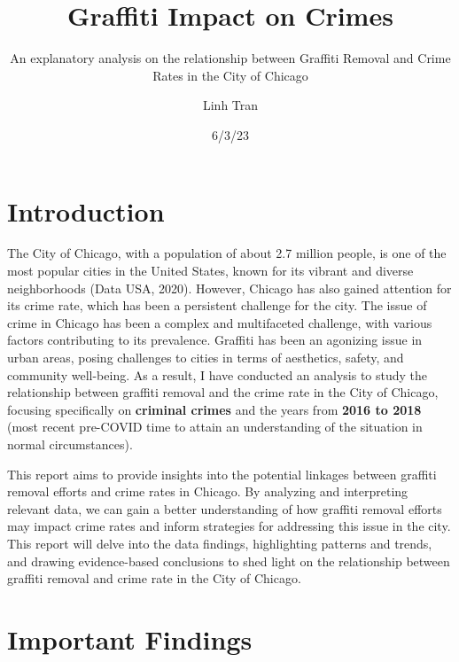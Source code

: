 \documentclass[
]{report}
\title{Graffiti Impact on Crimes}
\subtitle{An explanatory analysis on the relationship between Graffiti
Removal and Crime Rates in the City of Chicago}
\author{Linh Tran}
\date{6/3/23}
\renewcommand*\contentsname{Table of contents}
\newcommand\contentsname{Table of contents}
\begin{document}
\maketitle
\ifdefined\Shaded\renewenvironment{Shaded}{\begin{tcolorbox}[breakable, borderline west={3pt}{0pt}{shadecolor}, enhanced, frame hidden, interior hidden, sharp corners, boxrule=0pt]}{\end{tcolorbox}}\fi

\renewcommand*\contentsname{Table of contents}
{
\hypersetup{linkcolor=}
\setcounter{tocdepth}{2}
\tableofcontents
}
\hypertarget{introduction}{%
\section{Introduction}\label{introduction}}

The City of Chicago, with a population of about 2.7 million people, is
one of the most popular cities in the United States, known for its
vibrant and diverse neighborhoods (Data USA, 2020). However, Chicago has
also gained attention for its crime rate, which has been a persistent
challenge for the city. The issue of crime in Chicago has been a complex
and multifaceted challenge, with various factors contributing to its
prevalence. Graffiti has been an agonizing issue in urban areas, posing
challenges to cities in terms of aesthetics, safety, and community
well-being. As a result, I have conducted an analysis to study the
relationship between graffiti removal and the crime rate in the City of
Chicago, focusing specifically on \textbf{criminal crimes} and the years
from \textbf{2016 to 2018} (most recent pre-COVID time to attain an
understanding of the situation in normal circumstances).

This report aims to provide insights into the potential linkages between
graffiti removal efforts and crime rates in Chicago. By analyzing and
interpreting relevant data, we can gain a better understanding of how
graffiti removal efforts may impact crime rates and inform strategies
for addressing this issue in the city. This report will delve into the
data findings, highlighting patterns and trends, and drawing
evidence-based conclusions to shed light on the relationship between
graffiti removal and crime rate in the City of Chicago.

\hypertarget{important-findings}{%
\section{Important Findings}\label{important-findings}}
\end{document}
